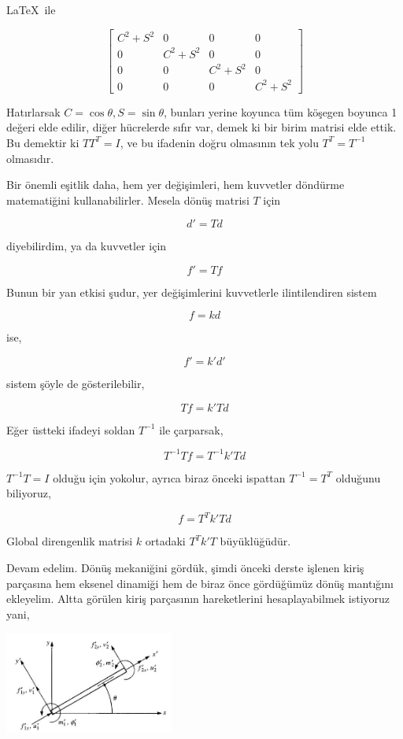 \documentclass[12pt,fleqn]{article}\usepackage{../../common}
\begin{document}
\LaTeX\ ile

$$
\left[\begin{matrix}C^{2} + S^{2} & 0 & 0 & 0\\0 & C^{2} + S^{2} & 0 & 0\\0 & 0 & C^{2} + S^{2} & 0\\0 & 0 & 0 & C^{2} + S^{2}\end{matrix}\right]
$$

Hatırlarsak $C = \cos\theta, S = \sin\theta$, bunları yerine koyunca tüm köşegen
boyunca 1 değeri elde edilir, diğer hücrelerde sıfır var, demek ki bir birim
matrisi elde ettik. Bu demektir ki $T T^T = I$, ve bu ifadenin doğru olmasının
tek yolu $T^T = T^{-1}$ olmasıdır.

Bir önemli eşitlik daha, hem yer değişimleri, hem kuvvetler döndürme
matematiğini kullanabilirler. Mesela dönüş matrisi $T$ için

$$
d' = T d
$$

diyebilirdim, ya da kuvvetler için

$$
f' = T f
$$

Bunun bir yan etkisi şudur, yer değişimlerini kuvvetlerle ilintilendiren
sistem

$$
f = k d
$$

ise,

$$
f' = k' d' 
$$

sistem şöyle de gösterilebilir,

$$
T f = k' T d
$$

Eğer üstteki ifadeyi soldan $T^{-1}$ ile çarparsak,

$$
T^{-1} T f = T^{-1} k' T d
$$

$T^{-1} T = I$ olduğu için yokolur, ayrıca biraz önceki ispattan $T^{-1} = T^T$
olduğunu biliyoruz,

$$
f = T^T k' T d
$$

Global direngenlik matrisi $k$ ortadaki $T^T k' T$ büyüklüğüdür.

Devam edelim. Dönüş mekaniğini gördük, şimdi önceki derste işlenen kiriş
parçasına hem eksenel dinamiği hem de biraz önce gördüğümüz dönüş mantığını
ekleyelim.  Altta görülen kiriş parçasının hareketlerini hesaplayabilmek
istiyoruz yani,

\includegraphics[width=15em]{phy_020_strs_06_02.jpg}
\end{document}
